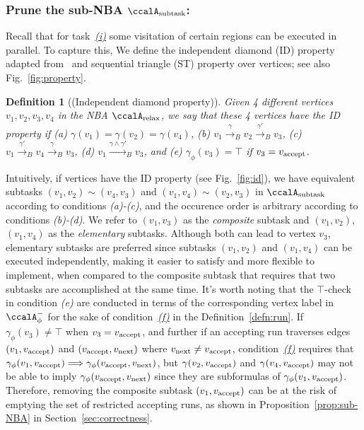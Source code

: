 \documentclass[Afour,sageh,times]{sagej}
\newtheorem{defn}[thm]{Definition}
\newcommand{\auto}[1]{\ccalA_{\textup{#1}}}
\newcommand{\autop}{\ccalA_{\phi}}
\newcommand{\vertex}[1]{v_{\textup{#1}}}
\newcommand{\simplies}{\DOTSB\Longrightarrow}
\begin{document}
  \subsubsection{Prune the sub-NBA \upshape $\auto{subtask}$:} \label{sub-NBA:2}
Recall that for task~\hyperref[task:i]{\it (i)}  some visitation of certain regions can be executed in parallel. To capture this, We define the independent diamond (ID) property adapted from~\cite{stefanescu2006automatic}  and sequential triangle (ST) property over vertices; see also Fig.~\ref{fig:property}.
\begin{defn}[(Independent diamond property)]\label{defn:id}
  Given 4 different vertices $v_1, v_2, v_3, v_4$ in the NBA $\auto{relax}$, we say that these 4 vertices have the ID property if (a) $\gamma(v_1) = \gamma(v_2) = \gamma(v_4)$, (b) $v_1 \xrightarrow{\gamma}_B v_2 \xrightarrow{\gamma'}_B v_3$, (c) $v_1 \xrightarrow{\gamma'}_B v_4 \xrightarrow{\gamma}_B v_3$,  (d) $v_1 \xrightarrow{\gamma \wedge \gamma'}_B v_3$, and (e) $\gamma_\phi(v_3) = \top$ if $v_3 = \vertex{accept}$.
\end{defn}
Intuitively, if vertices have the ID property (see Fig.~\ref{fig:id}), we have equivalent subtasks $(v_1, v_2) \sim (v_4, v_3)$ and $(v_1, v_4) \sim (v_2, v_3)$ in $\auto{subtask}$ according to conditions {\it (a)-(c)}, and the occurence order is arbitrary according to conditions {\it (b)-(d)}.  We refer to $(v_1, v_3)$ as the {\it composite} subtask and $(v_1, v_2)$, $(v_1, v_4)$ as the {\it elementary} subtasks.  Although both can lead to vertex $v_3$, elementary subtasks are preferred since subtasks $(v_1, v_2)$ and $(v_1, v_4)$ can be executed independently, making it easier to satisfy and more flexible to implement, when compared to the composite subtask that requires that two subtasks are accomplished at the same time. It's worth noting that the $\top$-check in condition {\it (e)} are conducted in terms of the corresponding vertex label in $\autop^-$ for the sake of condition~\hyperref[cond:f]{\it (f)} in the Definition~\ref{defn:run}. If $\gamma_\phi(v_3) \ne \top$ when $v_3 = \vertex{accept}$, and further if an accepting run traverses edges $(v_1, \vertex{accept})$ and $(\vertex{accept}, \vertex{next})$ where $\vertex{next}\neq \vertex{accept}$, condition~\hyperref[cond:f]{\it (f)} requires that $\gamma_\phi(v_1, \vertex{accept}) \simplies \gamma_\phi(\vertex{accept}, \vertex{next})$, but $\gamma(v_2, \vertex{accept})$ and $\gamma(v_4, \vertex{accept})$ may not be able to imply $\gamma_\phi(\vertex{accept}, \vertex{next})$ since they are subformulas of $\gamma_\phi(v_1, \vertex{accept})$. Therefore, removing the composite subtask $(v_1, \vertex{accept})$ can be at the risk of emptying the  set of restricted accepting runs,  as shown in Proposition~\ref{prop:sub-NBA} in Section~\ref{sec:correctness}.
\end{document}
